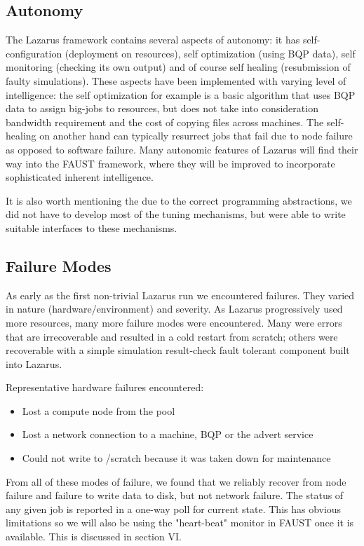 \documentclass{sig-alternate}
\begin{document}
\subsection{Autonomy}
The Lazarus framework contains several aspects of autonomy: it has
self-configuration (deployment on resources), self optimization (using
BQP data), self monitoring (checking its own output) and of course
self healing (resubmission of faulty simulations). These aspects have
been implemented with varying level of intelligence: the self
optimization for example is a basic algorithm that uses BQP data to
assign big-jobs to resources, but does not take into consideration
bandwidth requirement and the cost of copying files across
machines. The self-healing on another hand can typically resurrect
jobs that fail due to node failure as opposed to software
failure. Many autonomic features of Lazarus will find their way into
the FAUST framework, where they will be improved to incorporate
sophisticated inherent intelligence.  

It is also worth mentioning the due to the correct programming
abstractions, we did not have to develop most of the tuning
mechanisms, but were able to write suitable interfaces to these
mechanisms.


\subsection{Failure Modes}
As early as the first non-trivial Lazarus run we encountered failures. They
varied in nature (hardware/environment) and severity. As Lazarus progressively
used more resources, many more failure modes were encountered.
Many were errors that are irrecoverable and resulted in a
cold restart from scratch; others were recoverable with a simple simulation 
result-check fault tolerant component built into Lazarus.

Representative hardware failures encountered:
\begin{itemize}\addtolength{\itemsep}{-0.8\baselineskip}
\item{Lost a compute node from the pool}
\item{Lost a network connection to a machine, BQP or the advert service}
\item{Could not write to /scratch because it was taken down for maintenance}
\end{itemize}
From all of these modes of failure, we found that we reliably recover
from node failure and failure to write data to disk, but not network
failure. The status of any given job is reported in a one-way poll for
current state. This has obvious limitations so we will also be using
the "heart-beat" monitor in FAUST once it is available. This is discussed
in section VI.
\end{document}
